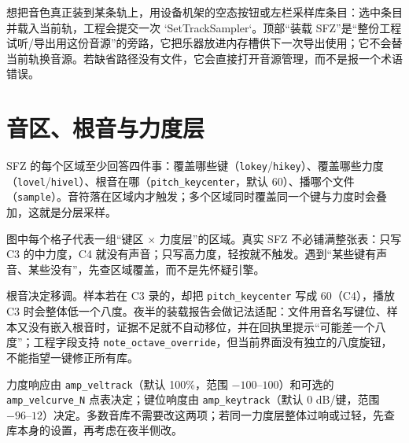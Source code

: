 想把音色真正装到某条轨上，用设备机架的空态按钮或左栏采样库条目：选中条目并载入当前轨，工程会提交一次 `SetTrackSampler`。顶部“装载 SFZ”是“整份工程试听/导出用这份音源”的旁路，它把乐器放进内存槽供下一次导出使用；它不会替当前轨换音源。若缺省路径没有文件，它会直接打开音源管理，而不是报一个术语错误。

\section{音区、根音与力度层}

SFZ 的每个区域至少回答四件事：覆盖哪些键（\texttt{lokey}/\texttt{hikey}）、覆盖哪些力度（\texttt{lovel}/\allowbreak\texttt{hivel}）、根音在哪（\texttt{pitch_keycenter}，默认 60）、播哪个文件（\texttt{sample}）。音符落在区域内才触发；多个区域同时覆盖同一个键与力度时会叠加，这就是分层采样。

\begin{center}
\end{center}

图中每个格子代表一组“键区 × 力度层”的区域。真实 SFZ 不必铺满整张表：只写 C3 的中力度，C4 就没有声音；只写高力度，轻按就不触发。遇到“某些键有声音、某些没有”，先查区域覆盖，而不是先怀疑引擎。

根音决定移调。样本若在 C3 录的，却把 \texttt{pitch_keycenter} 写成 60（C4），播放 C3 时会整体低一个八度。夜半的装载报告会做记法适配：文件用音名写键位、样本又没有嵌入根音时，证据不足就不自动移位，并在回执里提示“可能差一个八度”；工程字段支持 \texttt{note\_octave\_override}，但当前界面没有独立的八度旋钮，不能指望一键修正所有库。

力度响应由 \texttt{amp\_veltrack}（默认 100\%，范围 $-100$–$100$）和可选的 \texttt{amp\_velcurve\_N} 点表决定；键位响度由 \texttt{amp\_keytrack}（默认 0 dB/键，范围 $-96$–$12$）决定。多数音库不需要改这两项；若同一力度层整体过响或过轻，先查库本身的设置，再考虑在夜半侧改。

